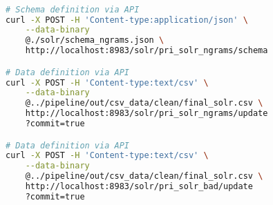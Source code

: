 \begin{lstlisting}[language=bash, captionpos=b, columns=fullflexible, basicstyle=\small, caption=Indexing Process Commands, label={lst:indexing-process}]

# Schema definition via API
curl -X POST -H 'Content-type:application/json' \
    --data-binary 
    @./solr/schema_ngrams.json \
    http://localhost:8983/solr/pri_solr_ngrams/schema

# Data definition via API
curl -X POST -H 'Content-type:text/csv' \
    --data-binary 
    @../pipeline/out/csv_data/clean/final_solr.csv \
    http://localhost:8983/solr/pri_solr_ngrams/update
    ?commit=true

# Data definition via API
curl -X POST -H 'Content-type:text/csv' \
    --data-binary 
    @../pipeline/out/csv_data/clean/final_solr.csv \
    http://localhost:8983/solr/pri_solr_bad/update
    ?commit=true

\end{lstlisting}